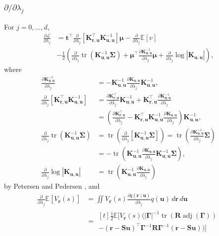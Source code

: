 \documentclass{mpaper}
\DeclareMathOperator{\adj}{adj}
\DeclareMathOperator{\tr}{tr}
\newcommand{\V}{V_{\mathbf{r}}}
\newcommand{\dx}{\,d\mathbf{r}\,d\mathbf{u}}
\newcommand{\Kuu}{\mathbf{K}_{\mathbf{u},\mathbf{u}}}
\newcommand{\Kru}{\mathbf{K}_{\mathbf{r},\mathbf{u}}}
\newcommand{\dlj}{\frac{\partial}{\partial \lambda_j}}
\begin{document}
\subsubsection{\texorpdfstring{$\partial/\partial \lambda_j$}{Derivative w.r.t.
    Lambda}}

For $j = 0, \dots, d$,
\[
  \begin{split}
    \frac{\partial \mathcal{L}}{\partial \lambda_j} &= \mathbf{t}^\intercal\dlj
    \left[ \Kru^\intercal\Kuu^{-1} \right] \bm\mu - \dlj\mathbb{E}[v] \\
    &- \frac{1}{2} \left(\dlj \tr \left(\Kuu^{-1}\bm\Sigma \right) +
      \bm\mu^\intercal \frac{\partial \Kuu^{-1}}{\partial \lambda_j} \bm\mu +
      \dlj \log |\Kuu| \right),
  \end{split}
\]
where
\begin{align*}
  \frac{\partial \Kuu^{-1}}{\partial \lambda_j} &= -\Kuu^{-1}\frac{\partial \Kuu}{\partial \lambda_j}\Kuu^{-1}, \\
  \dlj \left[ \Kru^\intercal\Kuu^{-1} \right] &= \frac{\partial \Kru^\intercal}{\partial \lambda_j} \Kuu^{-1} + \Kru^\intercal \frac{\partial \Kuu^{-1}}{\partial \lambda_j} \\
                                                &= \left( \frac{\partial \Kru^\intercal}{\partial \lambda_j} - \Kru^\intercal\Kuu^{-1}\frac{\partial \Kuu}{\partial \lambda_j} \right) \Kuu^{-1}, \\
  \dlj \tr(\Kuu^{-1}\bm\Sigma) &= \tr \left( \dlj \left[ \Kuu^{-1}\bm\Sigma \right] \right) = \tr \left( \frac{\partial \Kuu^{-1}}{\partial \lambda_j} \bm\Sigma \right) \\
                                                &= -\tr \left( \Kuu^{-1} \frac{\partial \Kuu}{\partial \lambda_j} \Kuu^{-1} \bm\Sigma \right), \\
  \dlj\log|\Kuu| &= \tr \left( \Kuu^{-1} \frac{\partial \Kuu}{\partial \lambda_j} \right)
\end{align*}
by Petersen and Pedersen \cite{petersen2008matrix}, and
\[
  \begin{split}
    \dlj \mathbb{E}[\V(s)] &= \iint\V(s)\frac{\partial q(\mathbf{r} \mid
      \mathbf{u})}{\partial \lambda_j}q(\mathbf{u})\dx \\
    &= \!\begin{multlined}[t]
      \frac{1}{2}\mathbb{E}[\V(s) (|\bm\Gamma|^{-1} \tr(\mathbf{R}
          \adj(\bm\Gamma)) \\
          - (\mathbf{r} -
          \mathbf{Su})^\intercal\bm\Gamma^{-1}\mathbf{R}\bm\Gamma^{-1}(\mathbf{r}
          - \mathbf{Su}))]
    \end{multlined}
  \end{split}
\]
\end{document}
